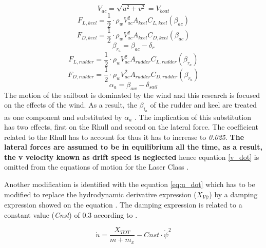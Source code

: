 \begin{equation} \label{eq:app_current_vel}
    V_{ac}=\sqrt{u^2 + v^2}=V_{boat}
\end{equation}
\begin{equation} \label{eq:keel_lift}
    F_{L,keel}=\frac{1}{2} \cdot \rho_{w} V_{ac}^2 A_{keel}C_{L,keel}(\beta_{ac})
\end{equation}
\begin{equation} \label{eq:keel_drag}
    F_{D,keel}=\frac{1}{2} \cdot \rho_{w} V_{ac}^2 A_{keel}C_{D,keel}(\beta_{ac})
\end{equation}
\begin{equation} \label{eq:angle_attack_rudder}
    \beta_{r_{a}} = \beta_{ac} - \delta_{r}
\end{equation}
\begin{equation} \label{eq:rudder_lift}
    F_{L,rudder}=\frac{1}{2} \cdot \rho_{w} V_{ac}^2 A_{rudder}C_{L,rudder}(\beta_{r_{a}})
\end{equation}
\begin{equation} \label{eq:rudder_drag}
    F_{D,rudder}=\frac{1}{2} \cdot \rho_{w} V_{ac}^2 A_{rudder}C_{D,rudder}(\beta_{r_{a}})
\end{equation}
\begin{equation} \label{eq:angle_attack_sail}
    \alpha_{a} = \beta_{aw} - \delta_{sail}
\end{equation}
The motion of the sailboat is dominated by the wind and this research is focused on the effects of the wind. As a result, the $\beta_{i_{a}}$ of the rudder and keel are treated as one component and substituted by $\alpha_{a}$ \cite{rein2012tra}. The implication of this substitution has two effects, first on the \acrshort{Rhull} and second on the lateral force. The coefficient related to the \acrshort{Rhull} has to account for thus it has to increase to \textit{0.025}. \textbf{The lateral forces are assumed to be in equilibrium all the time,  as a result, the \acrshort{v} velocity known as drift speed is neglected} hence equation \ref{v_dot} is omitted from the equations of motion for the Laser Class \cite{rein2012tra}.\par  
Another modification is identified with the equation \ref{eq:u_dot} which has to be modified to replace the hydrodynamic derivative expression ($X_{V\psi}$) by a damping expression showed on the equation \label{eq:u_dotLaser}. The damping expression is related to a constant value  (\textit{Cnst}) of 0.3 according to \cite{rein2012tra}. \par
\begin{equation} \label{eq:u_dotLaserM}
    \Dot{u}=\frac{X_{TOT}}{m+m_{x}}-Cnst \cdot \Dot{\psi}^2
\end{equation}
